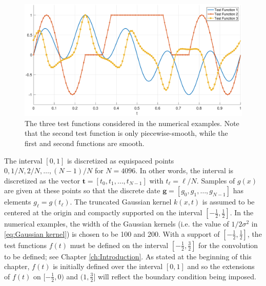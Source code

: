 \documentclass[12pt,notitlepage]{report}
\newcommand{\gVec}{\mathbf{g}}	%
\newcommand{\tVec}{\mathbf{t}}	%
\newcommand{\noiseSD}{\sigma}	%
\begin{document}
\begin{figure}
	\centerline{\includegraphics[scale = 0.45]{Figures/TestFunctions1D.eps}}
\caption{The three test functions considered in the numerical examples. Note that the second test function is only piecewise-smooth, while the first and second functions are smooth.}
\label{TestFunctions}
\end{figure}

The interval $[0,1]$ is discretized as equispaced points $0, 1/N, 2/N, \ldots, (N-1)/N$ for $N = 4096$. In other words, the interval is discretized as the vector $\tVec = [t_0,t_1,\ldots,t_{N-1}]$ with $t_\ell = \ell/N$. Samples of $g(x)$ are given at these points so that the discrete date $\gVec = [g_0,g_1,\ldots,g_{N-1}]$ has elements $g_\ell = g(t_\ell)$. The truncated Gaussian kernel $k(x,t)$ is assumed to be centered at the origin and compactly supported on the interval $[-\frac{1}{2},\frac{1}{2}]$. In the numerical examples, the width of the Gaussian kernels (i.e. the value of $1/2\noiseSD^2$ in \eqref{eq:Gaussian kernel}) is chosen to be 100 and 200. With a support of $[-\frac{1}{2},\frac{1}{2}]$, the test functions $f(t)$ must be defined on the interval $[-\frac{1}{2},\frac{3}{2}]$ for the convolution to be defined; see Chapter \ref{ch:Introduction}. As stated at the beginning of this chapter, $f(t)$ is initially defined over the interval $[0,1]$ and so the extensions of $f(t)$ on $[-\frac{1}{2},0)$ and $(1,\frac{3}{2}]$ will reflect the boundary condition being imposed.

\end{document}
